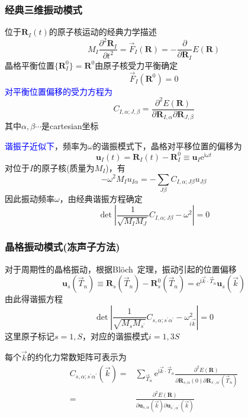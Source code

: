 \documentclass[cjk,slidestop,compress,mathserif,blue]{beamer}
\begin{document}
\frame
{
	\frametitle{经典三维振动模式}
			位于$\mathbf{R}_I(t)$的原子核运动的经典力学描述
			\begin{displaymath}
				M_I\frac{\partial^2\mathbf{R}_I}{\partial t^2}=\vec F_I(\mathbf{R})=-\frac{\partial}{\partial\mathbf{R}_I}E(\mathbf{R})
			\end{displaymath}
			晶格平衡位置$\{\mathbf{R}_I^0\}=\mathbf R^0$由原子核受力平衡确定
			\begin{displaymath}
				\vec F_I(\mathbf R^0)=0
			\end{displaymath}
			\textcolor{blue}{对平衡位置偏移的受力方程为}
			\begin{displaymath}
				C_{I,\alpha;J,\beta}=\frac{\partial^2E(\mathbf{R})}{\partial\mathbf{R}_{I,\alpha}\partial\mathbf{R}_{J,\beta}}
			\end{displaymath}
			其中$\alpha,\beta\cdots$是\textrm{cartesian}坐标

			\textcolor{blue}{谐振子近似下}，频率为$\omega$的谐振模式下，晶格对平移位置的偏移为
			\begin{displaymath}
				\mathbf{u}_I(t)=\mathbf{R}_I(t)-\mathbf{R}_I^0\equiv\mathbf{u}_I\mathrm{e}^{\mathrm{i}\omega t}
			\end{displaymath}
			对位于$I$的原子核(质量为$M_I$)，有
			\begin{displaymath}
				-\omega^2M_Iu_{I\alpha}=-\sum_{J\beta}C_{I,\alpha;J\beta}u_{J\beta}
			\end{displaymath}
			因此振动频率$\omega$，由经典谐振方程确定
			\begin{displaymath}
				\det\left|\frac1{\sqrt{M_IM_J}}C_{I,\alpha;J\beta}-\omega^2\right|=0
			\end{displaymath}
}

\frame
{
	\frametitle{晶格振动模式(冻声子方法)}
	对于周期性的晶格振动，根据\textrm{Bl\"och~}定理，振动引起的位置偏移
			\begin{displaymath}
				\mathbf{u}_s(\vec T_n)\equiv\mathbf{R}_s(\vec T_n)-\mathbf{R}_s^0(\vec T_n)=\mathrm{e}^{\mathrm{i}\vec k\cdot\vec T_n}\mathbf{u}_s(\vec k)
			\end{displaymath}
			由此得谐振方程
			\begin{displaymath}
				\det\left|\frac1{\sqrt{M_sM_{s^{\prime}}}}C_{s,\alpha;s^{\prime}\alpha^{\prime}}-\omega_{i\vec k}^2\right|=0
			\end{displaymath}
			这里原子标记$s=1,S$，对应的谐振模式$i=1,3S$

			每个$\vec k$的约化力常数矩阵可表示为
			\begin{displaymath}
				\begin{aligned}
				C_{s,\alpha;s^{\prime}\alpha^{\prime}}(\vec k)=&\sum_{\vec T_n}\mathrm{e}^{\mathrm{i}\vec k\cdot\vec T_n}\frac{\partial^2 E(\mathbf{R})}{\partial\mathbf{R}_{s,\alpha}(0)\partial\mathbf{R}_{s^{\prime},\alpha^{\prime}}(\vec T_n)}\\
				=&\frac{\partial^2E(\mathbf{R})}{\partial\mathbf{u}_{s,\alpha}(\vec k)\partial\mathbf{u}_{s^{\prime},\alpha^{\prime}}(\vec k)} 
				\end{aligned}
			\end{displaymath}
}
\end{document}
